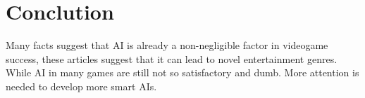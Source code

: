 \documentclass{article}
\begin{document}
\section{Conclution}
Many facts suggest that AI is already a non-negligible factor in videogame success, these articles suggest that it can lead to novel entertainment genres. While AI in many games are still not so satisfactory and dumb. More attention is needed to develop more smart AIs.


\end{document}
